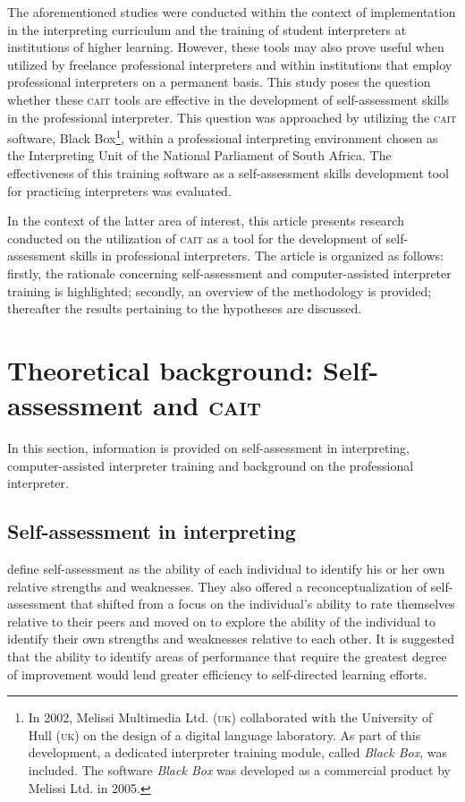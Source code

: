 \documentclass[output=paper]{langsci/langscibook}
\begin{document}
The aforementioned studies were conducted within the context of implementation in the interpreting curriculum and the training of student interpreters at institutions of higher learning. However, these tools may also prove useful when utilized by freelance professional interpreters and within institutions that employ professional interpreters on a permanent basis. This study poses the question whether these \textsc{cait} tools are effective in the development of self-assessment skills in the professional interpreter. This question was approached by utilizing the \textsc{cait} software, Black Box\footnote{In 2002, Melissi Multimedia Ltd. (\textsc{uk}) collaborated with the University of Hull (\textsc{uk}) on the design of a digital language laboratory. As part of this development, a dedicated interpreter training module, called \textit{Black Box}, was included. The software \textit{Black Box} was developed as a commercial product by Melissi Ltd. in 2005.}, within a professional interpreting environment chosen as the Interpreting Unit of the National Parliament of South Africa. The effectiveness of this training software as a self-assessment skills development tool for practicing interpreters was evaluated. 

In the context of the latter area of interest, this article presents research conducted on the utilization of \textsc{cait} as a tool for the development of self-assessment skills in professional interpreters. The article is organized as follows: firstly, the rationale concerning self-assessment and computer-assisted interpreter training is highlighted; secondly, an overview of the methodology is provided; thereafter the results pertaining to the hypotheses are discussed.

\section{Theoretical background: Self-assessment and \textsc{cait}}

In this section, information is provided on self-assessment in interpreting, com\-puter-assisted interpreter training and background on the professional interpret\-er.

\subsection{Self-assessment in interpreting}\label{sec:deysel:2.1}

\citet[74]{Regehr1996} define self-assessment as the ability of each individual to identify his or her own relative strengths and weaknesses. They also offered a reconceptualization of self-assessment that shifted from a focus on the individual’s ability to rate themselves relative to their peers and moved on to explore the ability of the individual to identify their own strengths and weaknesses relative to each other. It is suggested that the ability to identify areas of performance that require the greatest degree of improvement would lend greater efficiency to self-directed learning efforts.
\end{document}
